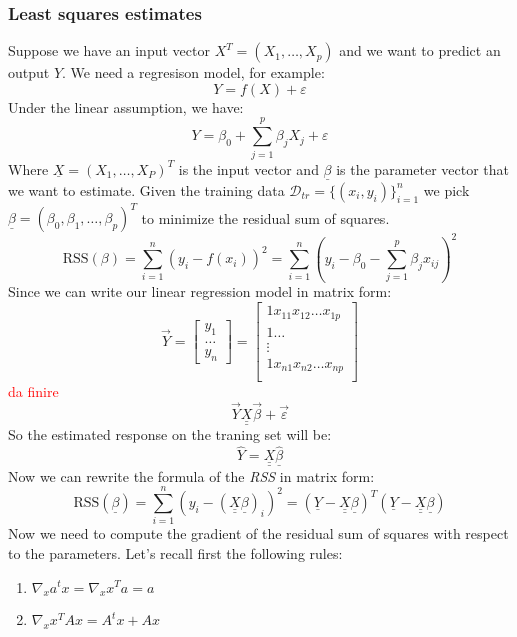 \subsubsection*{Least squares estimates}
Suppose we have an input vector $X^T = (X_1, \dots, X_p)$ and we want to predict an output $Y$. We need a regresison model, for example:
\[
    Y = f(X) + \varepsilon
\]
Under the linear assumption, we have:
\[
    Y = \beta_0 + \sum_{j=1}^{p} \beta_j X_j + \varepsilon
\]
Where $\underline{X} = (X_1, \dots, X_P)^T$ is the input vector and $\underline{\beta}$ is the parameter vector that we want to estimate.
Given the training data $\mathcal{D}_{tr} = \{ (x_i, y_i) \}_{i=1}^n$
we pick $\underline{\beta} = \left(\beta_0, \beta_1, \dots, \beta_p\right)^T$ to minimize the residual sum of squares.
\[
    \text{RSS}(\beta) = \sum_{i=1}^{n} (y_i - f(x_i))^2 = \sum_{i=1}^{n} \left(y_i - \beta_0 - \sum_{j=1}^{p} \beta_j x_{ij}\right)^2
\]
Since we can write our linear regression model in matrix form:
\[
    \vec{Y} = \begin{bmatrix}
        y_1 \\ \dots \\ y_n
    \end{bmatrix}
    = \begin{bmatrix}
        1 x_{11} x_{12} \dots x_{1p} \\
        1 \dots                      \\
        \vdots                       \\
        1 x_{n1} x_{n2} \dots x_{np} \\
    \end{bmatrix}
\]
\textcolor{red}{da finire}
\[
    \vec{Y} \underline{\underline{X}} \vec{\beta} + \vec{\varepsilon}
\]
So the estimated response on the traning set will be:
\[
    \hat{Y} = \underline{\underline{X}} \underline{\hat{\beta}}
\]
Now we can rewrite the formula of the \textit{RSS} in matrix form:
\[
    \text{RSS}(\underline{\beta})  = \sum_{i=1}^{n} \left(y_i - (\underline{\underline{X}} \underline{\beta})_i\right)^2 = (\underline{Y} - \underline{\underline{X}} \underline{\beta})^T(\underline{Y} - \underline{\underline{X}} \underline{\beta})
\]
Now we need to compute the gradient of the residual sum of squares with respect to the parameters. Let's recall first the following rules:
\begin{enumerate}
    \item $\nabla_x a^t x = \nabla_x x^T a =  a$
    \item $\nabla_x x^T A x = A^t x + A x$
\end{enumerate}
